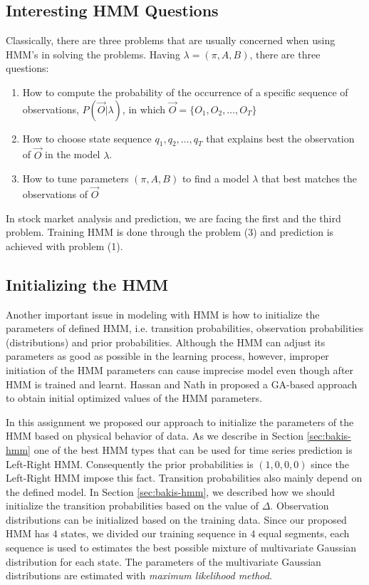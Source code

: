 \documentclass{acm_proc_article-sp}
\begin{document}
\subsection{Interesting HMM Questions} \label{sec:hmm_probs}
Classically, there are three problems that are usually concerned when using HMM's in solving the problems. Having
$\lambda = (\pi, A, B)$, there are three questions:
\begin{enumerate}
  \item How to compute the probability of the occurrence of a specific sequence of observations, $P(\vec{O}|\lambda)$,
  in which $\vec{O} = \{O_1, O_2, \ldots, O_T\}$
  \item How to choose state sequence $q_1, q_2, \ldots, q_T$ that explains best the observation of $\vec{O}$ in the
  model $\lambda$.
  \item How to tune parameters $(\pi, A, B)$ to find a model $\lambda$ that best matches the observations of $\vec{O}$
\end{enumerate}

In stock market analysis and prediction, we are facing the first and the third problem. Training HMM is done through
the problem (3) and prediction is achieved with problem (1).

\subsection{Initializing the HMM} \label{sec:ini_hmm}
Another important issue in modeling with HMM is how to initialize the parameters of defined HMM, i.e.  transition
probabilities, observation probabilities (distributions) and prior probabilities. Although the HMM can adjust its 
parameters as good as possible in the learning process, however, improper initiation of the HMM parameters can cause 
imprecise model even though after HMM is trained and learnt. Hassan and Nath in \cite{hassan:hmm_GA} proposed  a
GA-based approach to obtain initial optimized values of the HMM parameters.

In this assignment we proposed our approach to initialize the parameters of the HMM based on physical behavior of data.
As we describe in Section \ref{sec:bakis-hmm} one of the best HMM types that can be used for time series prediction is
Left-Right HMM. Consequently the prior probabilities is $(1,0,0,0)$ since the Left-Right HMM impose this fact. Transition 
probabilities also mainly depend on the defined model. In Section \ref{sec:bakis-hmm}, we described how we should 
initialize the transition probabilities based on the value of $\Delta$. Observation distributions can be initialized
based on the training data. Since our proposed HMM has $4$ states, we divided our training sequence in $4$ equal
segments, each sequence is used to estimates the best possible mixture of multivariate Gaussian distribution for each
state. The parameters of the multivariate Gaussian distributions are estimated with \textit{maximum likelihood method}.
\end{document}
